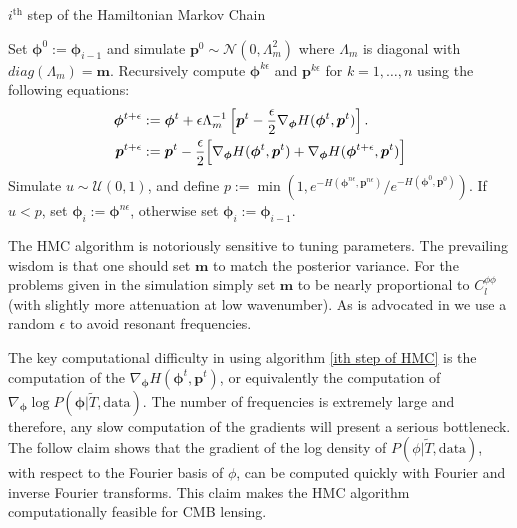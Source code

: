 \documentclass[noinfoline]{imsart}
\newcommand{\bs}{\boldsymbol}
\begin{document}
\begin{algorithm}[H]
\small
\caption{ $i^\text{th}$ step of the Hamiltonian Markov Chain}
\label{ith step of HMC}
\begin{algorithmic}[1]
\State Set $\bs \phi^0:= \bs \phi_{i-1}$ and simulate $\bs p^0 \sim \mathcal N(0,\Lambda_m^2 )$ where $\Lambda_m$ is diagonal with  $diag(\Lambda_m)=\bs m$.
\State  Recursively compute $\bs \phi^{k\epsilon}$ and $\bs p^{k\epsilon}$ for $k=1,\ldots, n$ using the following equations:
\begin{align*}
\bs \phi^{t+\epsilon} &:= \bs \phi^{t} + \epsilon \Lambda_m^{-1} \left[ \bs p^t - \frac{\epsilon}{2} \nabla_{\bs \phi} H(\bs \phi^t, \bs p^t) \right]. \\
\bs p^{t+\epsilon} &:= \bs p^{t} - \frac{\epsilon}{2}\Bigl[ \nabla_{\bs \phi} H(\bs \phi^t, \bs p^t) + \nabla_{\bs \phi} H(\bs \phi^{t+\epsilon}, \bs p^t)\Bigr]
\end{align*}
\State Simulate $u\sim \mathcal U(0,1)$, and define $p:= \min\left(1,{e^{- H(\bs \phi^{n\epsilon}, \bs p^{n\epsilon})}}/{e^{-H(\bs \phi^0, \bs p^0)}}\right)$.
\State  If $u< p$,  set $\bs \phi_{i}:= \bs \phi^{n\epsilon}$, otherwise set  $\bs \phi_{i}:= \bs \phi_{i-1}$.
\end{algorithmic}
\end{algorithm}

The HMC algorithm is notoriously sensitive to tuning parameters. 
The prevailing wisdom is that one should set $\bs m$ to match the posterior variance. For the problems given in the simulation simply set  $\bs m$ to be nearly proportional  to $C_l^{\phi\phi}$ (with slightly more attenuation at low wavenumber).  As is advocated in \cite{taylor2008fast}  we  use a random $\epsilon$ to avoid resonant frequencies.


The key computational difficulty in using algorithm \ref{ith step of HMC} is the computation of the $\nabla_{\bs \phi} H(\bs \phi^t, \bs p^t)$, or equivalently the computation of $\nabla_{\bs \phi} \log P(\bs \phi|\widetilde T, \text{data})$. The number of frequencies is extremely large and therefore, any slow computation of the gradients will present a serious bottleneck. 
The follow claim shows that the gradient of the log density of $P(\phi|\widetilde T, \text{data})$, with respect to the Fourier basis of $\phi$, can be computed quickly with Fourier and inverse Fourier transforms. This claim makes the HMC algorithm computationally feasible for CMB lensing.
\end{document}
